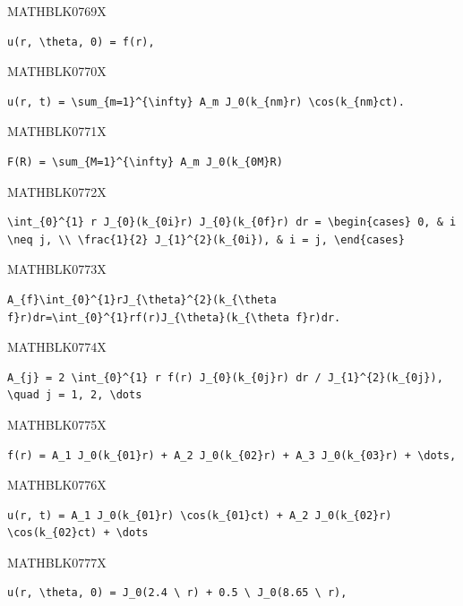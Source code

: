 \documentclass[
  ukrainian,
]{article}
\begin{document}
MATHBLK0769X

\begin{verbatim}
u(r, \theta, 0) = f(r),
\end{verbatim}

MATHBLK0770X

\begin{verbatim}
u(r, t) = \sum_{m=1}^{\infty} A_m J_0(k_{nm}r) \cos(k_{nm}ct).
\end{verbatim}

MATHBLK0771X

\begin{verbatim}
F(R) = \sum_{M=1}^{\infty} A_m J_0(k_{0M}R)
\end{verbatim}

MATHBLK0772X

\begin{verbatim}
\int_{0}^{1} r J_{0}(k_{0i}r) J_{0}(k_{0f}r) dr = \begin{cases} 0, & i \neq j, \\ \frac{1}{2} J_{1}^{2}(k_{0i}), & i = j, \end{cases}
\end{verbatim}

MATHBLK0773X

\begin{verbatim}
A_{f}\int_{0}^{1}rJ_{\theta}^{2}(k_{\theta f}r)dr=\int_{0}^{1}rf(r)J_{\theta}(k_{\theta f}r)dr.
\end{verbatim}

MATHBLK0774X

\begin{verbatim}
A_{j} = 2 \int_{0}^{1} r f(r) J_{0}(k_{0j}r) dr / J_{1}^{2}(k_{0j}), \quad j = 1, 2, \dots
\end{verbatim}

MATHBLK0775X

\begin{verbatim}
f(r) = A_1 J_0(k_{01}r) + A_2 J_0(k_{02}r) + A_3 J_0(k_{03}r) + \dots,
\end{verbatim}

MATHBLK0776X

\begin{verbatim}
u(r, t) = A_1 J_0(k_{01}r) \cos(k_{01}ct) + A_2 J_0(k_{02}r) \cos(k_{02}ct) + \dots
\end{verbatim}

MATHBLK0777X

\begin{verbatim}
u(r, \theta, 0) = J_0(2.4 \ r) + 0.5 \ J_0(8.65 \ r),
\end{verbatim}
\end{document}

